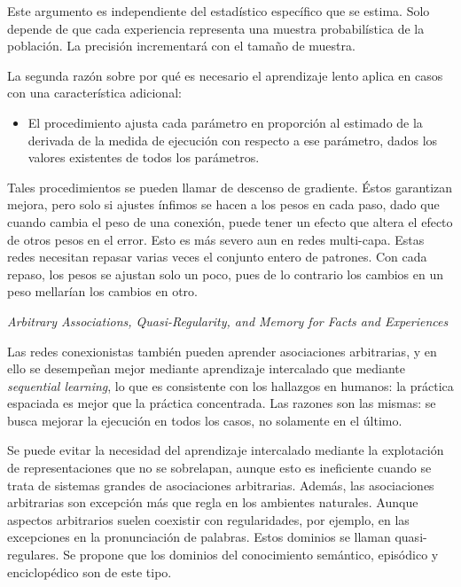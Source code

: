 \documentclass[a4paper,12pt]{article}
\begin{document}
Este argumento es independiente del estadístico específico que se estima. Solo depende de que cada experiencia representa una muestra probabilística de la población. La precisión incrementará con el tamaño de muestra.

La segunda razón sobre por qué es necesario el aprendizaje lento aplica en casos con una característica adicional:
\begin{itemize}
	\item El procedimiento ajusta cada parámetro en proporción al estimado de la derivada de la medida de ejecución con respecto a ese parámetro, dados los valores existentes de todos los parámetros.
\end{itemize}

Tales procedimientos se pueden llamar de descenso de gradiente. Éstos garantizan mejora, pero solo si ajustes ínfimos se hacen a los pesos en cada paso, dado que cuando cambia el peso de una conexión, puede tener un efecto que altera el efecto de otros pesos en el error. Esto es más severo aun en redes multi-capa. Estas redes necesitan repasar varias veces el conjunto entero de patrones. Con cada repaso, los pesos se ajustan solo un poco, pues de lo contrario los cambios en un peso mellarían los cambios en otro. 

{\itshape Arbitrary Associations, Quasi-Regularity, and Memory for Facts and Experiences}

Las redes conexionistas también pueden aprender asociaciones arbitrarias, y en ello se desempeñan mejor mediante aprendizaje intercalado que mediante {\itshape sequential learning}, lo que es consistente con los hallazgos en humanos: la práctica espaciada es mejor que la práctica concentrada. Las razones son las mismas: se busca mejorar la ejecución en todos los casos, no solamente en el último.

Se puede evitar la necesidad del aprendizaje intercalado mediante la explotación de representaciones que no se sobrelapan, aunque esto es ineficiente cuando se trata de sistemas grandes de asociaciones arbitrarias. Además, las asociaciones arbitrarias son excepción más que regla en los ambientes naturales. Aunque aspectos arbitrarios suelen coexistir con regularidades, por ejemplo, en las excepciones en la pronunciación de palabras. Estos dominios se llaman quasi-regulares. Se propone que los dominios del conocimiento semántico, episódico y enciclopédico son de este tipo. 
\end{document}
